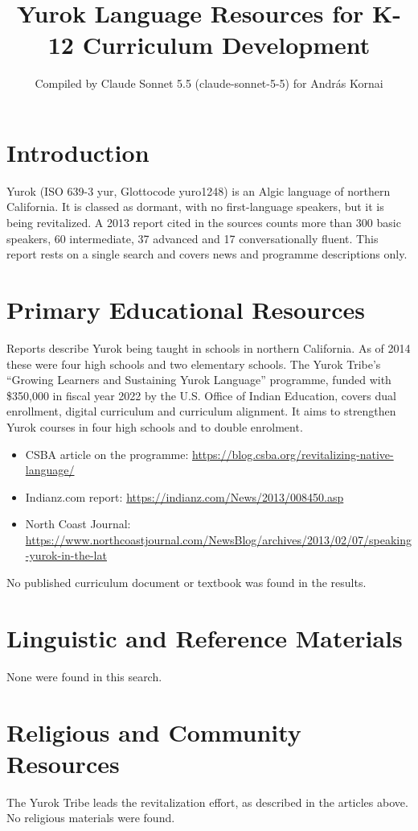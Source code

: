 \documentclass[12pt]{article}
\title{Yurok Language Resources for K-12 Curriculum Development}
\author{Compiled by Claude Sonnet 5.5 (claude-sonnet-5-5) for Andr\'as Kornai}
\date{}
\begin{document}
\maketitle

\section{Introduction}
Yurok (ISO 639-3 yur, Glottocode yuro1248) is an Algic language of northern California. It is classed as dormant, with no first-language speakers, but it is being revitalized. A 2013 report cited in the sources counts more than 300 basic speakers, 60 intermediate, 37 advanced and 17 conversationally fluent. This report rests on a single search and covers news and programme descriptions only.

\section{Primary Educational Resources}
Reports describe Yurok being taught in schools in northern California. As of 2014 these were four high schools and two elementary schools. The Yurok Tribe's ``Growing Learners and Sustaining Yurok Language'' programme, funded with \$350,000 in fiscal year 2022 by the U.S. Office of Indian Education, covers dual enrollment, digital curriculum and curriculum alignment. It aims to strengthen Yurok courses in four high schools and to double enrolment.
\begin{itemize}
\item CSBA article on the programme: \url{https://blog.csba.org/revitalizing-native-language/}
\item Indianz.com report: \url{https://indianz.com/News/2013/008450.asp}
\item North Coast Journal: \url{https://www.northcoastjournal.com/NewsBlog/archives/2013/02/07/speaking-yurok-in-the-lat}
\end{itemize}
No published curriculum document or textbook was found in the results.

\section{Linguistic and Reference Materials}
None were found in this search.

\section{Religious and Community Resources}
The Yurok Tribe leads the revitalization effort, as described in the articles above. No religious materials were found.
\end{document}
